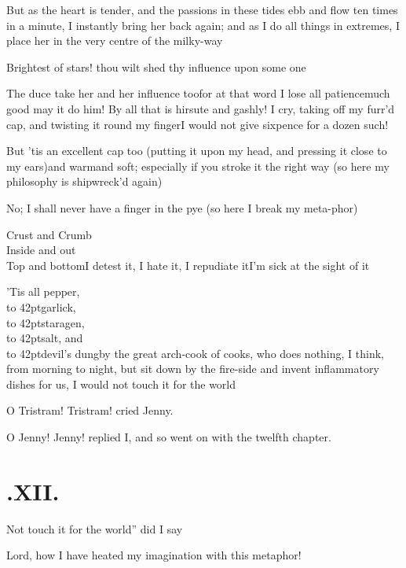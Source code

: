 \documentclass{article}
\begin{document}
But as the heart is tender, and the passions in these tides ebb
and flow ten times in a minute, I instantly bring her back again;
and as I do all things in extremes, I place her in the very
centre\break
of the milky-way\tsh

Brightest of stars! thou wilt shed thy influence upon some
one\tsh{}

\tsh The duce take her and her influence
too\tsh for at that word I lose all
patience\tsh much good may it do him! \tsh By all
that is hirsute and gashly!\break
I cry, taking off my furr’d cap, and twisting it round my
finger\tsh I would not give sixpence for a dozen such!

\tsh But ’tis an excellent cap too (putting it upon my head, and
pressing it close to my ears)\tsk and warm\tsk and soft;
especially if you stroke it the right way\tsk\break
{}
(so here my philosophy is shipwreck’d again)

\tsh No; I shall never have a finger in the pye (so
here I break my meta-\break phor)\tsh{}

Crust and Crumb\\
\null\indent Inside and out\\
\null\indent Top and bottom\tsh I detest it, I hate it, I repudiate
it\tsh I’m sick at the sight of it \tsh 

’Tis all pepper,\\
\null\hbox to 42pt{\hss}garlick,\\
\null\hbox to 42pt{\hss}staragen,\\
\null\hbox to 42pt{\hss}salt, and\\
\null\hbox to 42pt{\hss}devil’s dung\tsh by
the great arch-cook of cooks, who does nothing, I think, from
morning to night, but sit down by the fire-side and invent
inflammatory dishes for us, I would not touch it for the
world\tsh

\tsh O Tristram! Tristram! cried Jenny.

O Jenny! Jenny! replied I, and so went on
with the twelfth chapter.

\vfill

\section{.\enspace XII.}

\qquad\tsh \lqq Not touch it for the world”\break
did I say\tsh

Lord, how I have heated my imagination with this metaphor!
\end{document}
